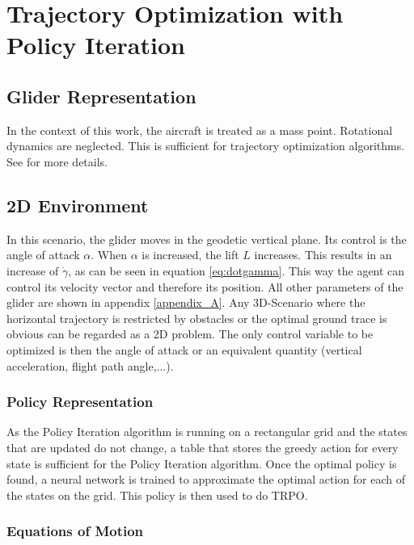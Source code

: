 \chapter{Trajectory Optimization with Policy Iteration}

\section{Glider Representation}

In the context of this work, the aircraft is treated as a mass point. Rotational dynamics are neglected. This is sufficient for trajectory optimization algorithms. See \cite{Fichter2009} for more details. 

\section{2D Environment}

In this scenario, the glider moves in the geodetic vertical plane. Its control is the angle of attack $\alpha$. When $\alpha$ is increased, the lift $L$ increases. This results in an increase of $\dot{\gamma}$, as can be seen in equation \ref{eq:dotgamma}. This way the agent can control its velocity vector and therefore its position. All other parameters of the glider are shown in appendix \ref{appendix_A}. Any 3D-Scenario where the horizontal trajectory is restricted by obstacles or the optimal ground trace is obvious can be regarded as a 2D problem. The only control variable to be optimized is then the angle of attack or an equivalent quantity (vertical acceleration, flight path angle,...).

\subsection{Policy Representation}

As the Policy Iteration algorithm is running on a rectangular grid and the states that are updated do not change, a table that stores the greedy action for every state is sufficient for the Policy Iteration algorithm. Once the optimal policy is found, a neural network is trained to approximate the optimal action for each of the states on the grid. This policy is then used to do TRPO.

\subsection{Equations of Motion}

